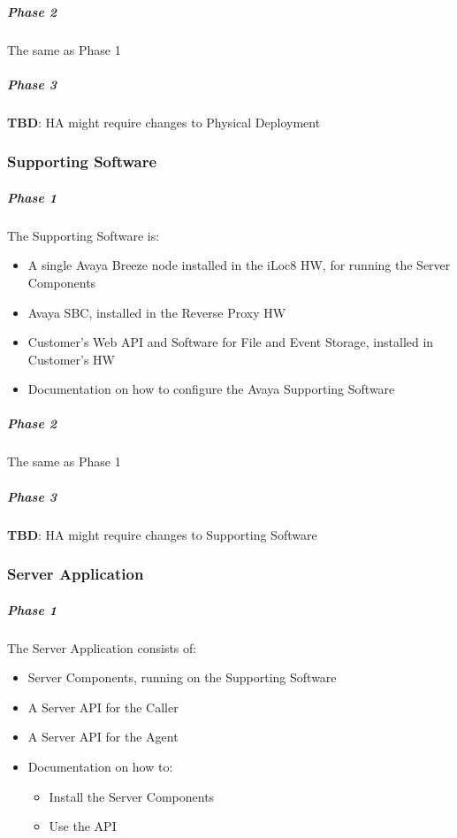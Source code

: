 \documentclass{article}
\begin{document}
	\subparagraph*{Phase 2}
	
	The same as Phase 1

	\subparagraph*{Phase 3}
	
	\textbf{\color{red} TBD}: HA might require changes to Physical Deployment

	\subsubsection{Supporting Software}
	
	\subparagraph*{Phase 1}
	
	The Supporting Software is:
	\begin{itemize}
		\item A single Avaya Breeze node installed in the iLoc8 HW, for running the Server Components
		\item Avaya SBC, installed in the Reverse Proxy HW
		\item Customer's Web API and Software for File and Event Storage, installed in Customer's HW
		\item Documentation on how to configure the Avaya Supporting Software
	\end{itemize}
	
	\subparagraph*{Phase 2}
	
	The same as Phase 1

	\subparagraph*{Phase 3}
	
	\textbf{\color{red} TBD}: HA might require changes to Supporting Software

	\subsubsection{Server Application}

	\subparagraph*{Phase 1}
	
	The Server Application consists of:
	\begin{itemize}
		\item Server Components, running on the Supporting Software
		\item A Server API for the Caller
		\item A Server API for the Agent
		\item Documentation on how to:
		\begin{itemize}
			\item Install the Server Components
			\item Use the API
		\end{itemize}
	\end{itemize}
\end{document}
